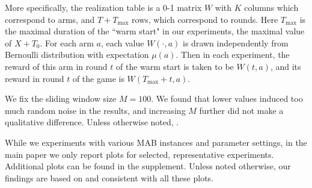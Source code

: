 \documentclass[../competing_bandits.tex]{subfiles}
\begin{document}
More specifically, the realization table is a 0-1 matrix $W$ with $K$ columns which correspond to arms, and $T+T_{\max}$ rows, which correspond to rounds. Here $T_{\max}$ is the maximal duration of the ``warm start" in our experiments, \ie the maximal value of $X+T_0$. For each arm $a$, each value $W(\cdot,a)$ is drawn independently from Bernoulli distribution with expectation $\mu(a)$. Then in each experiment, the reward of this arm in round $t$ of the warm start is taken to be $W(t,a)$, and its reward in round $t$ of the game is $W(T_{\max}+t,a)$.

We fix the sliding window size $M = 100$. We found that lower values induced too much random noise in the results, and increasing $M$ further did not make a qualitative difference. Unless otherwise noted, . 


While we experiments with various MAB instances and parameter settings, in the main paper we only report plots for selected, representative experiments. Additional plots can be found in the supplement. Unless noted otherwise, our findings are based on and consistent with all these plots.
\end{document}
